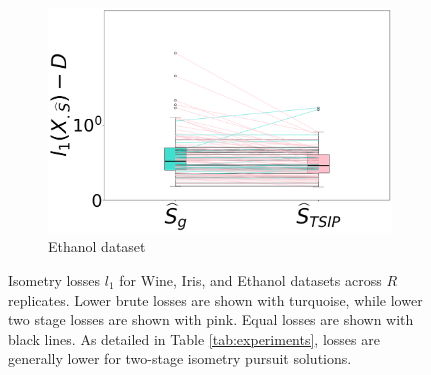 \begin{figure}[t]
\begin{subfigure}[b]{0.3\textwidth}
        \includegraphics[width=\textwidth]{../figures/ethanol_isometry_losses}
        \caption{Ethanol dataset}
        \label{fig:ethanol_isometry_losses}
    \end{subfigure}
    \caption{Isometry losses $l_1$  for Wine, Iris, and Ethanol datasets across $R$ replicates.
    Lower brute losses are shown with turquoise, while lower two stage losses are shown with pink.
    Equal losses are shown with black lines.
    As detailed in Table \ref{tab:experiments}, losses are generally lower for two-stage isometry pursuit solutions.}
    \label{fig:isometry_losses}
\end{figure}
